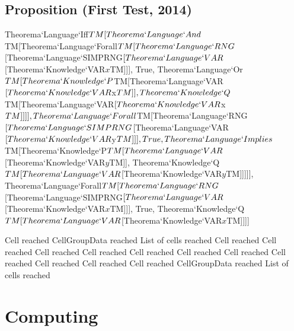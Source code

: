 \documentclass{article}
\newcommand{\light}[1]{{\color{lightgray}#1}}
\begin{document}
\begin{openenvironment}
\end{openenvironment}\begin{tmaenvironment}
\subsection{Proposition (First Test, 2014)}
Theorema`Language`Iff$TM[Theorema`Language`And$TM[Theorema`Language`Forall$TM[Theorema`Language`RNG$[Theorema`Language`SIMPRNG$[Theorema`Language`VAR$[Theorema`Knowledge`VAR$x$TM]]], True, Theorema`Language`Or$TM[Theorema`Knowledge`P$TM[Theorema`Language`VAR$[Theorema`Knowledge`VAR$x$TM]], Theorema`Knowledge`Q$TM[Theorema`Language`VAR$[Theorema`Knowledge`VAR$x$TM]]]], Theorema`Language`Forall$TM[Theorema`Language`RNG$[Theorema`Language`SIMPRNG$[Theorema`Language`VAR$[Theorema`Knowledge`VAR$y$TM]]], True, Theorema`Language`Implies$TM[Theorema`Knowledge`P$TM[Theorema`Language`VAR$[Theorema`Knowledge`VAR$y$TM]], Theorema`Knowledge`Q$TM[Theorema`Language`VAR$[Theorema`Knowledge`VAR$y$TM]]]]], Theorema`Language`Forall$TM[Theorema`Language`RNG$[Theorema`Language`SIMPRNG$[Theorema`Language`VAR$[Theorema`Knowledge`VAR$x$TM]]], True, Theorema`Knowledge`Q$TM[Theorema`Language`VAR$[Theorema`Knowledge`VAR$x$TM]]]]\end{tmaenvironment}
\light{Cell reached} \light{CellGroupData reached} \light{List of cells reached} \light{Cell reached} \light{Cell reached} \light{Cell reached} \light{Cell reached} \light{Cell reached} \light{Cell reached} \light{Cell reached} \light{Cell reached} \light{Cell reached} \light{Cell reached} \light{Cell reached} \light{CellGroupData reached} \light{List of cells reached} \section{Computing}
\end{document}
